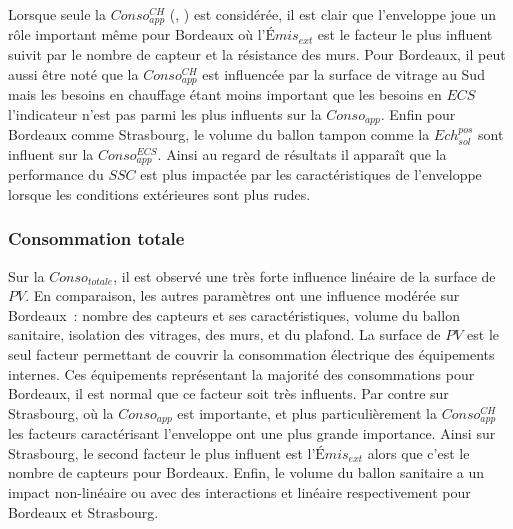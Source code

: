 Lorsque seule la $Conso_{app}^{CH}$ (, )
est considérée, il est clair que l’enveloppe joue un rôle important même pour Bordeaux où
l’$Émis_{ext}$ est le facteur le plus influent suivit par le nombre de capteur et la
résistance des murs. Pour Bordeaux, il peut aussi être noté que la $Conso_{app}^{CH}$ est
influencée par la surface de vitrage au Sud mais les besoins en chauffage étant moins
important que les besoins en $ECS$ l’indicateur n’est pas parmi les plus influents sur la
$Conso_{app}$. Enfin pour Bordeaux comme Strasbourg, le volume du ballon tampon comme la
$Ech_{sol}^{pos}$ sont influent sur la $Conso_{app}^{ECS}$. Ainsi au regard de résultats
il apparaît que la performance du $SSC$ est plus impactée par les caractéristiques de
l’enveloppe lorsque les conditions extérieures sont plus rudes.


\subsubsection{Consommation totale} %
\label{ssub:consommation_totale}
Sur la $Conso_{totale}$, il est observé une très forte influence linéaire de la surface de
$PV$. En comparaison, les autres paramètres ont une influence modérée sur Bordeaux~:
nombre des capteurs et ses caractéristiques, volume du ballon sanitaire, isolation des
vitrages, des murs, et du plafond. La surface de $PV$ est le seul facteur permettant de
couvrir la consommation électrique des équipements internes. Ces équipements représentant
la majorité des consommations pour Bordeaux, il est normal que ce facteur soit très
influents. Par contre sur Strasbourg, où la $Conso_{app}$ est importante, et plus
particulièrement la $Conso_{app}^{CH}$ les facteurs caractérisant l’enveloppe ont une plus
grande importance. Ainsi sur Strasbourg, le second facteur le plus influent est
l’$Émis_{ext}$ alors que c’est le nombre de capteurs pour Bordeaux. Enfin, le volume du
ballon sanitaire a un impact non-linéaire ou avec des interactions et linéaire
respectivement pour Bordeaux et Strasbourg.


